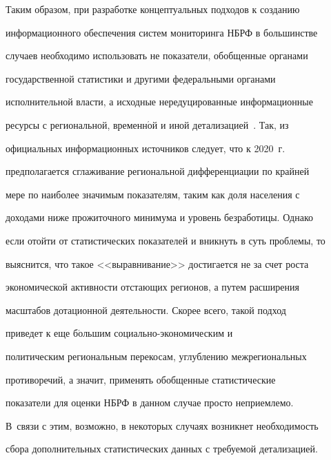     Таким образом, при разработке концептуальных подходов к созданию


информационного обеспечения систем мониторинга НБРФ в большинстве


случаев необходимо использовать не показатели, обобщенные органами


государственной статистики и другими федеральными органами


исполнительной власти, а исходные нередуцированные информационные


ресурсы с региональной, временн$\acute{\mbox{о}}$й и иной детализацией~\cite{5-luc}. Так, из


официальных информационных источников следует, что к 2020~г.\


предполагается сглаживание региональной дифференциации по крайней


мере по наиболее значимым показателям, таким как доля населения с


доходами ниже прожиточного минимума и уровень безработицы. Однако


если отойти от статистических показателей и вникнуть в суть проблемы, то


выяснится, что такое <<выравнивание>> достигается не за счет роста


экономической активности отстающих регионов, а путем расширения


масштабов дотационной деятельности. Скорее всего, такой подход


приведет к еще б$\acute{\mbox{о}}$льшим со\-ци\-аль\-но-эко\-но\-ми\-че\-ским и


политическим региональным перекосам, углублению межрегиональных


противоречий, а значит, применять обобщенные статистические


показатели для оценки НБРФ в данном случае просто неприемлемо.


В~связи с этим, возможно, в некоторых случаях возникнет необходимость


сбора дополнительных статистических данных с требуемой детализацией.





\vspace*{-4pt}





